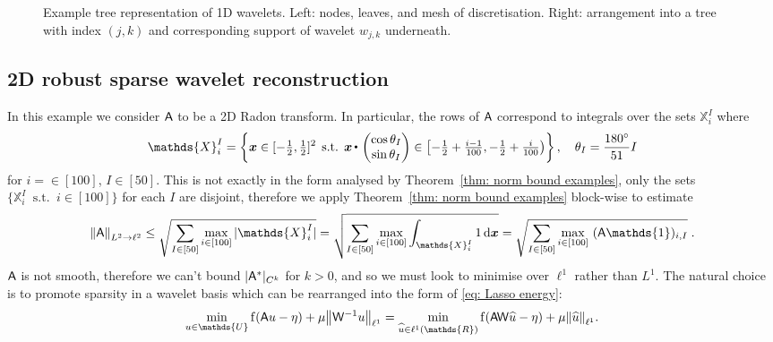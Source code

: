 \documentclass[smallextended]{svjour3}
\let\F\mathds\let\C\mathcal\newcommand{\R}{\F{R}}\newcommand{\A}{\tens{A}}
\newcommand{\norm}[1]{{\left\lVert #1 \right\rVert}}
\newcommand{\ip}[2]{#1 \vcenter{\hbox{\resizebox{6pt}{!}{\ensuremath\cdot}}} #2}
\newcommand{\op}[1]{\operatorname{#1}}
\newcommand{\1}{\F{1}}
\DeclareMathOperator{\st}{\;s.t.\;}
\renewcommand{\hat}{\widehat}\renewcommand{\tilde}{\widetilde}
\newcommand{\diff}{\mathop{}\!\mathrm{d}}
\newcommand{\data}{\eta}
\newcommand*{\var}[1]{%
	\IfEqCase{#1}{%
		{0}{u}%
		{1}{v}%
		{2}{w}%
	}[u#1]%
}
\begin{document}
\begin{figure}
\begin{center}
\end{center}
		\caption{Example tree representation of 1D wavelets. Left: nodes, leaves, and mesh of discretisation. Right: arrangement into a tree with index $(j,k)$ and corresponding support of wavelet $w_{j,k}$ underneath.}\label{fig: wavelet tree}
	\end{figure}
	
	\subsection{2D robust sparse wavelet reconstruction}\label{sec: wavelet examples}
	In this example we consider $\A$ to be a 2D Radon transform. In particular, the rows of $\A$ correspond to integrals over the sets $\F{X}^I_i$ where 
	\begin{equation}
		\F{X}_i^I = \left\{\vec{x}\in[-\tfrac12,\tfrac12]^2\st \ip{\vec{x}}{\begin{pmatrix}\cos\theta_I\\\sin\theta_I\end{pmatrix}}\in \left[-\tfrac12+\tfrac{i-1}{100},-\tfrac12+\tfrac{i}{100}\right)\right\}, \quad \theta_I=\frac{180^\circ}{51}I
	\end{equation}
	for $i=\in[100]$, $I\in[50]$.
	This is not exactly in the form analysed by Theorem~\ref{thm: norm bound examples}, only the sets $\{\F{X}^I_i\st i\in[100]\}$ for each $I$ are disjoint, therefore we apply Theorem~\ref{thm: norm bound examples} block-wise to estimate
	\begin{equation}
		\norm{\A}_{L^2\to\ell^2} \leq \sqrt{\sum_{I\in[50]}\max_{i\in[100]} |\F{X}^I_i|} = \sqrt{\sum_{I\in[50]}\max_{i\in[100]} \int_{\F{X}^I_i}1\diff\vec{x}}= \sqrt{\sum_{I\in[50]}\max_{i\in[100]}\ (\A\1)_{i,I}}\;.
	\end{equation}
	$\A$ is not smooth, therefore we can't bound $|\A^*|_{C^k}$ for $k>0$, and so we must look to minimise over $\ell^1$ rather than $L^1$. The natural choice is to promote sparsity in a wavelet basis which can be rearranged into the  form of \eqref{eq: Lasso energy}:
	\begin{equation}
		\min_{\var0\in \F{U}} \op{f}(\A\var0-\data) + \mu \norm{\tens{W}^{-1}\var0}_{\ell^1} = \min_{\hat{\var0}\in\ell^1(\R)} \op{f}(\A\tens{W}\hat{\var0}-\data) + \mu \norm{\hat{\var0}}_{\ell^1}.
	\end{equation}
\end{document}
